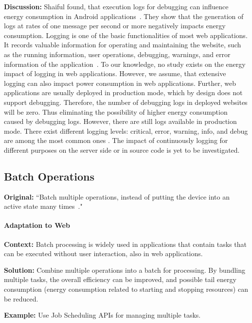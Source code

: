 \textbf{Discussion:} Shaiful \etal found, that execution logs for debugging can influence energy consumption in Android applications~\cite{Shaiful2018}. They show that the generation of logs at rates of one message per second or more negatively impacts energy consumption. Logging is one of the basic functionalities of most web applications. It records valuable information for operating and maintaining the website, such as the running information, user operations, debugging, warnings, and error information of the application~\cite{Pan2022}. To our knowledge, no study exists on the energy impact of logging in web applications. However, we assume, that extensive logging can also impact power consumption in web applications. Further, web applications are usually deployed in production mode, which by design does not support debugging. Therefore, the number of debugging logs in deployed websites will be zero. Thus eliminating the possibility of higher energy consumption caused by debugging logs. However, there are still logs available in production mode. There exist different logging levels: critical, error, warning, info, and debug are among the most common ones \cite{python-docs-logging}. The impact of continuously logging for different purposes on the server side or in source code is yet to be investigated.

\subsection{Batch Operations} \label{sec:patterns-BatchOperations}
\textbf{Original:} ``Batch multiple operations, instead of putting the device into an active state many times~\cite{cruz2019catalog}."

\paragraph{Adaptation to Web}\mbox{}

\textbf{Context:} Batch processing is widely used in applications that contain tasks that can be executed without user interaction, also in web applications.

\textbf{Solution:} Combine multiple operations into a batch for processing. By bundling multiple tasks, the overall efficiency can be improved, and possible tail energy consumption (energy consumption related to starting and stopping resources) can be reduced.

\textbf{Example:} Use Job Scheduling APIs for managing multiple tasks.

